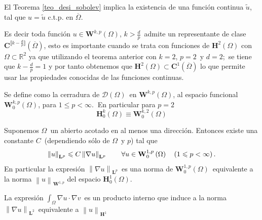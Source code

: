 \begin{obs}
	El Teorema \ref{teo_desi_sobolev} implica la existencia de una
	función continua $\tilde{u}$, tal que $u=\tilde{u}$ c.t.p. en $%
	\overline{\Omega }$.
	
	Es decir toda función $u\in \mathbf{W}^{k,p}\left( \Omega\right)
	$, $k>\frac{d}{p}$\ admite un representante de clase $\mathbf{C}^{\llbracket k-%
		\frac{d}{p}\rrbracket }\left( \overline{\Omega }\right) $, esto es %
	importante cuando se trata con funciones de $\mathbf{H}^{2}\left( \Omega \right)$ con
	$\Omega \subset \mathbb{R}^{2}$ ya que utilizando el teorema anterior
	con $k=2$, $p=2$\ y $d=2$;\ se tiene que $k-\frac{d}{p}=1$ y por tanto
	obtenemos que $\mathbf{H}^{2}\left( \Omega \right) \subset \mathbf{C}%
	^{1}\left( \overline{\Omega }\right) $ lo que permite usar las propiedades
	conocidas de las funciones continuas.
\end{obs}
\begin{defi}
	Se define como la cerradura de $\mathcal{D}\left( \Omega \right) $\ en $%
	\mathbf{W}^{k,p}\left( \Omega \right) $, al espacio funcional $\mathbf{W}%
	_{0}^{k,p}\left( \Omega \right) $, para $1\leqslant p<\infty $.$\mathit{\ }$%
	En particular para $p=2$
	\[
	\mathbf{H}_{0}^{k}\left( \Omega \right) \equiv \mathbf{W}_{0}^{k,2}\left(
	\Omega \right)
	\]
\end{defi}
\begin{teo}	
	\label{teo_poincare}Suponemos $\Omega $\ un abierto acotado en al menos una
	dirección. Entonces existe una constante $C$\ (dependiendo sólo de $%
	\Omega $\ y $p$) tal que
	\[
	\left\| u\right\| _{\mathbf{L}^{p}}\leqslant C\left\| \nabla u\right\| _{%
		\mathbf{L}^{p}}\qquad \forall u\in \mathbf{W}_{0}^{1,p}\left( \Omega \right)
	\quad \left( 1\leqslant p<\infty \right) .
	\]
	En particular la expresión $\left\| \nabla u\right\| _{\mathbf{L}^{p}}$\
	es una norma de $\mathbf{W}_{0}^{1,p}\left( \Omega \right) $\ equivalente a
	la norma $\left\| u\right\| _{\mathbf{W}^{1,p}}$ del espacio $\mathbf{H}%
	_{0}^{1}\left( \Omega \right) $.
	
	La expresión $\int_{\Omega }\nabla u\cdot \nabla v$\ es un producto
	interno que induce a la norma $\left\| \nabla u\right\| _{\mathbf{L}^{2}}$\
	equivalente a $\left\| u\right\| _{\mathbf{H}^{1}}$
\end{teo}

